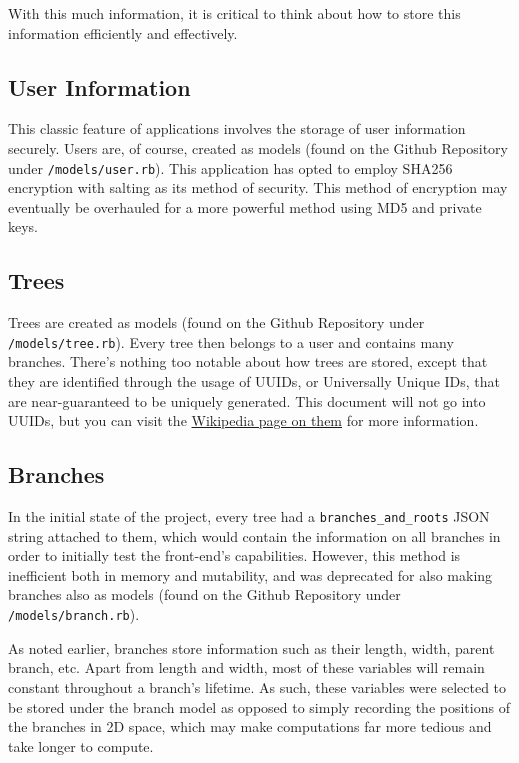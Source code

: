 With this much information, it is critical to think about how to store this information efficiently and effectively.

\subsection{User Information}

This classic feature of applications involves the storage of user information securely. Users are, of course, created as models (found on the Github Repository under \verb|/models/user.rb|). This application has opted to employ SHA256 encryption with salting as its method of security. This method of encryption may eventually be overhauled for a more powerful method using MD5 and private keys.

\subsection{Trees}

Trees are created as models (found on the Github Repository under \verb|/models/tree.rb|). Every tree then belongs to a user and contains many branches. There's nothing too notable about how trees are stored, except that they are identified through the usage of UUIDs, or Universally Unique IDs, that are near-guaranteed to be uniquely generated. This document will not go into UUIDs, but you can visit the \href{https://en.wikipedia.org/wiki/Universally_unique_identifier}{Wikipedia page on them} for more information.

\subsection{Branches}

In the initial state of the project, every tree had a \verb|branches_and_roots| JSON string attached to them, which would contain the information on all branches in order to initially test the front-end's capabilities. However, this method is inefficient both in memory and mutability, and was deprecated for also making branches also as models (found on the Github Repository under \verb|/models/branch.rb|).

As noted earlier, branches store information such as their length, width, parent branch, etc. Apart from length and width, most of these variables will remain constant throughout a branch's lifetime. As such, these variables were selected to be stored under the branch model as opposed to simply recording the positions of the branches in 2D space, which may make computations far more tedious and take longer to compute.

